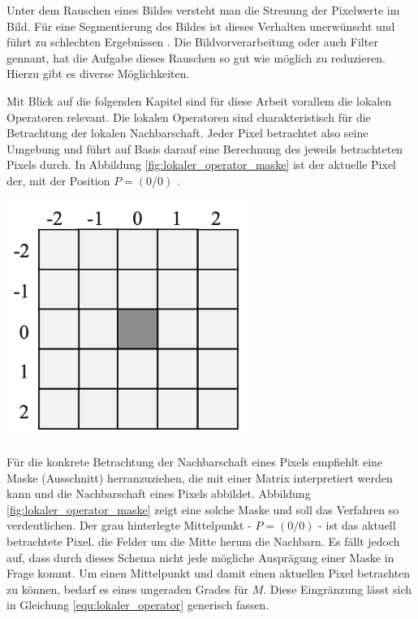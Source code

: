 Unter dem Rauschen eines Bildes versteht man die Streuung der Pixelwerte im Bild.
Für eine Segmentierung des Bildes ist dieses Verhalten unerwünscht und führt zu
schlechten Ergebnissen \citep[vgl.][Seite 51]{handels2000}. Die Bildvorverarbeitung
oder auch Filter gennant, hat die Aufgabe dieses Rauschen so gut wie möglich zu
reduzieren. Hierzu gibt es diverse Möglichkeiten.

\begin{minipage}{0.40\textwidth}
	Mit Blick auf die folgenden Kapitel sind für diese Arbeit vorallem die lokalen
	Operatoren relevant. Die lokalen Operatoren sind charakteristisch für die
	Betrachtung der lokalen Nachbarschaft. Jeder Pixel betrachtet also seine Umgebung
	und führt auf Basis darauf eine Berechnung des jeweils betrachteten Pixels durch.
	In Abbildung \ref{fig:lokaler_operator_maske} ist der aktuelle Pixel der, mit der
	Position $P = (0/0)$ \citep[vgl.][Seite 52]{handels2000}.
\end{minipage}
\hfill
\begin{minipage}{0.50\textwidth}
	\centering
	\includegraphics[width=0.60\textwidth]{img/lokaler_operator_maske.jpg}
	\label{fig:lokaler_operator_maske}
\end{minipage}

Für die konkrete Betrachtung der Nachbarschaft eines Pixels empfiehlt \citet[Seite
52]{handels2000} eine Maske (Ausschnitt) herranzuziehen, die mit einer Matrix interpretiert
werden kann und die Nachbarschaft eines Pixels abbildet. Abbildung
\ref{fig:lokaler_operator_maske} zeigt eine solche Maske und soll das Verfahren
so verdeutlichen. Der grau hinterlegte Mittelpunkt - $P = (0/0)$ - ist das aktuell
betrachtete Pixel. die Felder um die Mitte herum die Nachbarn. Es fällt jedoch auf,
dass durch dieses Schema nicht jede mögliche Ausprägung einer Maske in Frage
kommt. Um einen Mittelpunkt und damit einen aktuellen Pixel betrachten zu können,
bedarf es eines ungeraden Grades für $M$. Diese Eingränzung lässt sich in Gleichung
\ref{equ:lokaler_operator} generisch fassen.

